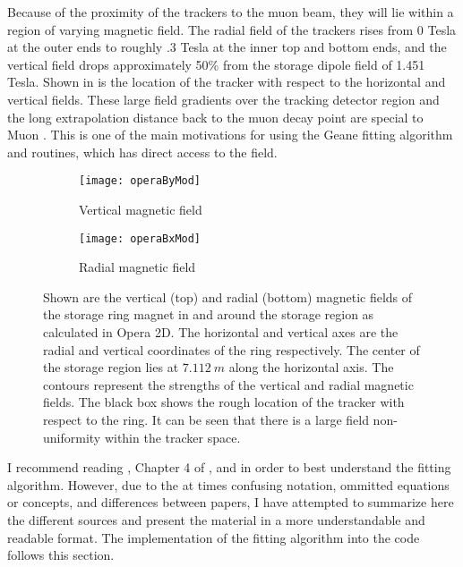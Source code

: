 Because of the proximity of the trackers to the muon beam, they will lie within a region of varying magnetic field. The radial field of the trackers rises from 0 Tesla at the outer ends to roughly .3 Tesla at the inner top and bottom ends, and the vertical field drops approximately 50\% from the storage dipole field of 1.451 Tesla. Shown in  is the location of the tracker with respect to the horizontal and vertical fields. These large field gradients over the tracking detector region and the long extrapolation distance back to the muon decay point are special to Muon \gmtwo. This is one of the main motivations for using the Geane fitting algorithm and routines, which has direct access to the field.

\begin{figure}[]
\centering
    \begin{subfigure}[]{0.75\textwidth}
        \centering
        \texttt{[image: operaByMod]}
        \caption{Vertical magnetic field}
    \label{fig:operaBy}
    \end{subfigure}%
    \vspace{5mm}
    \begin{subfigure}[]{0.75\textwidth}
        \centering
        \texttt{[image: operaBxMod]}
        \caption{Radial magnetic field}
    \label{fig:operaBx}
    \end{subfigure}
\caption[Vertical and radial magnetic fields calculated in Opera2D]{Shown are the vertical (top) and radial (bottom) magnetic fields of the storage ring magnet in and around the storage region as calculated in Opera 2D. The horizontal and vertical axes are the radial and vertical coordinates of the ring respectively. The center of the storage region lies at $\SI{7.112}{m}$ along the horizontal axis. The contours represent the strengths of the vertical and radial magnetic fields. The black box shows the rough location of the tracker with respect to the ring. It can be seen that there is a large field non-uniformity within the tracker space.}
\label{fig:Opera2DFields}
\end{figure}






    I recommend reading \cite{geanemanual}, Chapter 4 of \cite{Lavezzi}, and \cite{trajfit} in order to best understand the fitting algorithm. However, due to the at times confusing notation, ommitted equations or concepts, and differences between papers, I have attempted to summarize here the different sources and present the material in a more understandable and readable format. The implementation of the fitting algorithm into the code follows this section.

